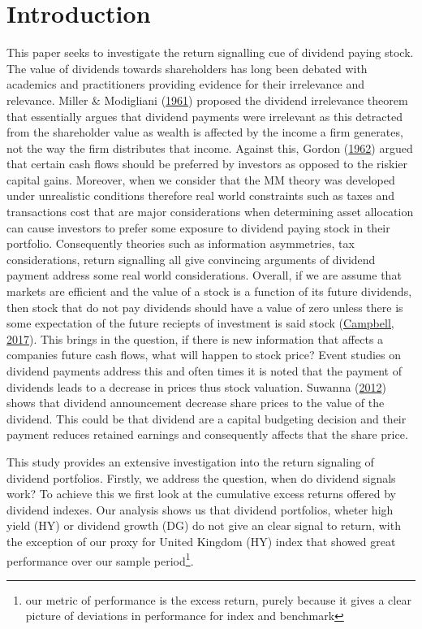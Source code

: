 \documentclass[12pt,preprint, authoryear]{elsarticle}
\numberwithin{equation}{section}
\numberwithin{figure}{section}
\numberwithin{table}{section}
\let\rmarkdownfootnote\footnote%
\def\footnote{\protect\rmarkdownfootnote}
\begin{document}
\newpage

\hypertarget{introduction}{%
\section{Introduction}\label{introduction}}

This paper seeks to investigate the return signalling cue of dividend
paying stock. The value of dividends towards shareholders has long been
debated with academics and practitioners providing evidence for their
irrelevance and relevance. Miller \& Modigliani
(\protect\hyperlink{ref-miller}{1961}) proposed the dividend irrelevance
theorem that essentially argues that dividend payments were irrelevant
as this detracted from the shareholder value as wealth is affected by
the income a firm generates, not the way the firm distributes that
income. Against this, Gordon (\protect\hyperlink{ref-gordon1962}{1962})
argued that certain cash flows should be preferred by investors as
opposed to the riskier capital gains. Moreover, when we consider that
the MM theory was developed under unrealistic conditions therefore real
world constraints such as taxes and transactions cost that are major
considerations when determining asset allocation can cause investors to
prefer some exposure to dividend paying stock in their portfolio.
Consequently theories such as information asymmetries, tax
considerations, return signalling all give convincing arguments of
dividend payment address some real world considerations. Overall, if we
are assume that markets are efficient and the value of a stock is a
function of its future dividends, then stock that do not pay dividends
should have a value of zero unless there is some expectation of the
future reciepts of investment is said stock
(\protect\hyperlink{ref-campbell2017financial}{Campbell, 2017}). This
brings in the question, if there is new information that affects a
companies future cash flows, what will happen to stock price? Event
studies on dividend payments address this and often times it is noted
that the payment of dividends leads to a decrease in prices thus stock
valuation. Suwanna (\protect\hyperlink{ref-suwanna2012impacts}{2012})
shows that dividend announcement decrease share prices to the value of
the dividend. This could be that dividend are a capital budgeting
decision and their payment reduces retained earnings and consequently
affects that the share price.

This study provides an extensive investigation into the return signaling
of dividend portfolios. Firstly, we address the question, when do
dividend signals work? To achieve this we first look at the cumulative
excess returns offered by dividend indexes. Our analysis shows us that
dividend portfolios, wheter high yield (HY) or dividend growth (DG) do
not give an clear signal to return, with the exception of our proxy for
United Kingdom (HY) index that showed great performance over our sample
period\footnote{our metric of performance is the excess return, purely
  because it gives a clear picture of deviations in performance for
  index and benchmark}.
\end{document}
